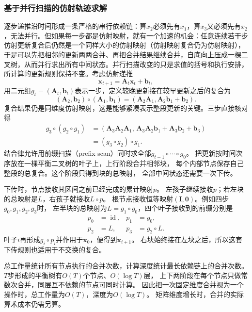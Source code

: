 \subsubsection{基于并行扫描的仿射轨迹求解}
逐步递推沿时间形成一条严格的串行依赖链：算\(x_2\)必须先有\(x_1\)，算\(x_3\)又必须先有\(x_2\)，无法并行。但如果每一步都是仿射映射，就有一个加速的机会：任意连续若干步仿射更新复合后仍然是一个同样大小的仿射映射（仿射映射复合仍为仿射映射），于是可以先把相邻的更新两两合并、再把合并结果继续合并，自底向上压成一棵二叉树，从而并行求出所有中间状态。并行扫描改变的只是求值的括号和执行安排，所计算的更新规则保持不变。考虑仿射递推
\begin{equation}
  \bm x_{t+1}=\bm A_t\bm x_t+\bm b_t,
  \label{eq:dynamical-affine-recurrence}
\end{equation}
用二元组$g_t=(\bm A_t,\bm b_t)$表示一步，定义较晚更新接在较早更新之后的复合为
\begin{equation}
  (\bm A_2,\bm b_2)\circ(\bm A_1,\bm b_1)
  =(\bm A_2\bm A_1,\bm A_2\bm b_1+\bm b_2).
  \label{eq:dynamical-affine-composition}
\end{equation}
复合结果仍是同维度仿射映射，这是能够紧凑表示整段更新的关键。三步直接核对得
\[
  \begin{aligned}
    g_3\circ(g_2\circ g_1)
    &=(\bm A_3\bm A_2\bm A_1,\,
       \bm A_3\bm A_2\bm b_1+\bm A_3\bm b_2+\bm b_3)\\
    &=(g_3\circ g_2)\circ g_1.
  \end{aligned}
\]
结合律允许用前缀扫描（prefix scan）同时求全部$g_{t-1}\circ\cdots\circ g_0$。
把更新按时间次序放在一棵平衡二叉树的叶子上，上行阶段合并相邻块，
每个内部节点保存自己整段的总复合。这个阶段只得到块的总映射，
全部中间状态还需要一次下传。

下传时，节点接收其区间之前已经完成的累计映射$p$。
左孩子继续接收$p$；若左块的总映射是$L$，右孩子就接收$L\circ p$。
根节点接收恒等映射$(\bm I,\bm0)$。例如四步$g_0,g_1,g_2,g_3$时，
左半块的总映射为$L=g_1\circ g_0$，四个叶子接收到的前缀分别是
\[
 \begin{aligned}
 p_0&=\operatorname{id},&p_1&=g_0,\\
 p_2&=L,&p_3&=g_2\circ L.
 \end{aligned}
\]
叶子$i$再形成$g_i\circ p_i$并作用于$\bm x_0$，便得到$\bm x_{i+1}$。
右块始终接在左块之后，所以这套下传规则也适用于不交换的复合。

总工作量统计所有节点执行的合并次数，计算深度统计最长依赖链上的合并次数。
$T$步形成的平衡树有$O(T)$个节点、$O(\log T)$层，
上下两阶段在每个节点只做常数次合并，同层互不依赖的节点可同时计算。
因此把一次固定维度合并视为一个操作时，总工作量为$O(T)$，深度为$O(\log T)$。
矩阵维度增长时，合并的实际算术成本仍需另算。

